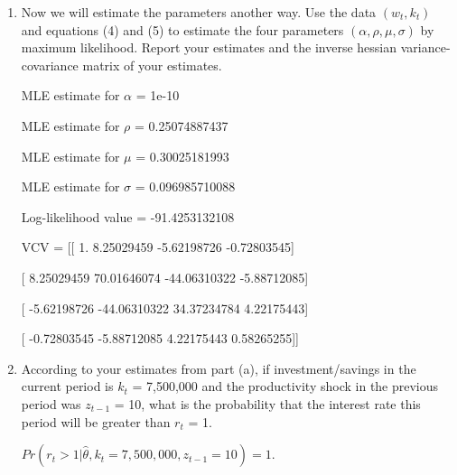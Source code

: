 \documentclass[letterpaper,12pt]{article}
\theoremstyle{definition}
\begin{document}
\begin{enumerate}
\begin{enumerate}
\item Now we will estimate the parameters another way. Use the data $(w_t, k_t)$ and equations (4) and (5) to estimate the four parameters $(\alpha, \rho, \mu, \sigma)$ by maximum likelihood. Report your estimates and the inverse hessian variance-covariance
matrix of your estimates.
\par\bigskip
MLE estimate for $\alpha$ = 1e-10 \par
MLE estimate for $\rho$ = 0.25074887437 \par
MLE estimate for $\mu$ = 0.30025181993 \par
MLE estimate for $\sigma$ = 0.096985710088 \par
Log-likelihood value = -91.4253132108\par
VCV = [[  1.           8.25029459  -5.62198726  -0.72803545] \par
\hspace{12mm}   [  8.25029459  70.01646074 -44.06310322  -5.88712085] \par
\hspace{12mm}   [ -5.62198726 -44.06310322  34.37234784   4.22175443] \par
\hspace{12mm}   [ -0.72803545  -5.88712085   4.22175443   0.58265255]] \par
\par\bigskip

\item According to your estimates from part (a), if investment/savings in the current period is $k_t$ = 7,500,000 and the productivity shock in the previous period was $z_{t-1}$ = 10, what is the probability that the interest rate this period will be greater than $r_t$ = 1.
\par\bigskip
$Pr(r_t > 1 | \hat{\theta}, k_t = 7,500,000, z_{t-1} = 10) =  1.$
\end{enumerate}
\end{enumerate}
\end{document}
